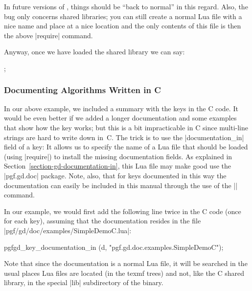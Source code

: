 In future versions of , things should be ``back to normal'' in this
regard. Also, the bug only concerns shared libraries; you can still create a
normal Lua file with a nice name and place at a nice location and the only
contents of this file is then the above |require| command.

Anyway, once we have loaded the shared library we can say:
%
\begin{codeexample}
\tikz {};
\end{codeexample}


\subsubsection{Documenting Algorithms Written in C}
\label{section-gd-documenting-c-algos}

In our above example, we included a summary with the keys in the C code. It
would be even better if we added a longer documentation and some examples that
show how the key works; but this is a bit impracticable in C since multi-line
strings are hard to write down in~C. The trick is to use the |documentation_in|
field of a key: It allows us to specify the name of a Lua file that should be
loaded (using |require|) to install the missing documentation fields. As
explained in Section~\ref{section-gd-documentation-in}, this Lua file may make
good use the |pgf.gd.doc| package. Note, also, that for keys documented in this
way the documentation can easily be included in this manual through the use of
the || command.

In our example, we would first add the following line twice in the C code (once
for each key), assuming that the documentation resides in the file
|pgf/gd/doc/examples/SimpleDemoC.lua|:
%
\begin{codeexample}[code only, tikz syntax=false]
  pgfgd_key_documentation_in (d, "pgf.gd.doc.examples.SimpleDemoC");
\end{codeexample}

Note that since the documentation is a normal Lua file, it will be searched in
the usual places Lua files are located (in the texmf trees) and not, like the C
shared library, in the special |lib| subdirectory of the  binary.

